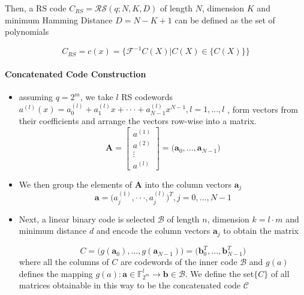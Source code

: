 \documentclass[fontsize=12pt]{article}
\begin{document}
Then, a RS code $C_{RS} =\mathcal{RS}(q;N,K,D) $ of length $N$, dimension $K$ and minimum Hamming Distance $D=N-K+1$ can be defined as the set of polynomials

$$C_{RS}=c(x)=\big\{\mathscr{F}^{-1}C(X) | C(X) \in\big\{C(X)\big\} \big\}$$

\paragraph{Concatenated Code Construction}
\begin{itemize}
\item assuming $q=2^m$, we take $l$ RS codewords $a^{(l)}(x)=a^{(l)}_0+a^{(l)}_1x+\cdot\cdot\cdot+a^{(l)}_{N-1}x^{N-1}, \mathit{l}=1,...,l$ , form vectors from their coefficients and arrange the vectors row-wise into a matrix. 
\begin{equation*}
\textbf{A}=
\begin{bmatrix}
           a^{(1)} \\
           a^{(2)} \\
           \vdots \\
            a^{(l)}
         \end{bmatrix}
         =\Big( \textbf{a}_0,...,\textbf{a}_{N-1}\Big)
\end{equation*}
\item We then group the elements of  \textbf{A} into the column vectors $\textbf{a}_j$
\begin{equation*}
\textbf{a}=\Big( a^{(1)}_j,\cdot\cdot\cdot ,a^{(l)}_j\Big)^T, j=0,...,N-1
\end{equation*}
\item Next, a linear binary code is selected $\mathcal{B}$ of length $n$, dimension $k=l\cdot m$ and minimum distance $d$ and encode the column vectors $\textbf{a}_j$ to obtain the matrix 

\begin{equation}
C=\Big( g(\textbf{a}_0),...,g(\textbf{a}_{N-1})\Big) = \Big( \textbf{b}_0^T,...,\textbf{b}_{N-1}^T\Big)
\end{equation}
where all the columns of $C$ are codewords of the inner code $\mathcal{B}$ and $g(a)$ defines the mapping $g(a) : \mathbf{a} \in \mathbb{F}^l_{2^m} \rightarrow \mathbf{b} \in \mathcal{B}$.
We define the set$\big\{ C \big\}$ of all matrices obtainable in this way
to be the concatenated code $\mathcal{C}$
\end{itemize}
\end{document}
